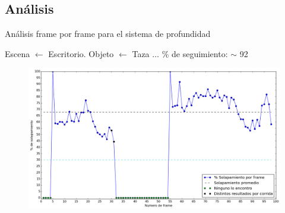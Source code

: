 \documentclass[]{beamer}
\begin{document}
\subsection{Análisis}
\begin{frame}{Análisis frame por frame para el sistema de profundidad}


    Escena $\leftarrow$ Escritorio. Objeto $\leftarrow$ Taza $\dots$ \% de seguimiento: $\sim$ 92
    \vspace*{-15pt}
    \begin{figure}
        \centering
        \includegraphics[scale=0.24]{img/frame_a_frame_depth-taza.png}
    \end{figure}

\end{frame}
\end{document}

